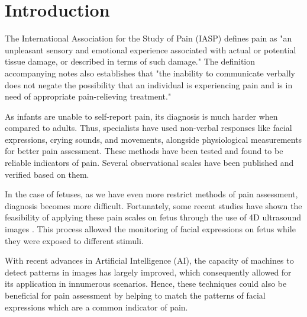 \documentclass[msc]{ppgccufmg}
\begin{document}

\chapter{Introduction}

The International Association for the Study of Pain (IASP) defines pain as "an unpleasant sensory and emotional experience associated with actual or potential tissue damage, or described in terms of such damage." \citep{merskey1994classification} The definition accompanying notes also establishes that "the inability to communicate verbally does not negate the possibility that an individual is experiencing pain and is in need of appropriate pain-relieving treatment."

As infants are unable to self-report pain, its diagnosis is much harder when compared to adults. Thus, specialists have used non-verbal responses like facial expressions, crying sounds, and movements, alongside physiological measurements for better pain assessment. These methods have been tested and found to be reliable indicators of pain. Several observational scales have been published and verified based on them.

In the case of fetuses, as we have even more restrict methods of pain assessment, diagnosis becomes more difficult. Fortunately, some recent studies have shown the feasibility of applying these pain scales on fetus through the use of 4D ultrasound images \citep{bernardes2018feasibility}. This process allowed the monitoring of facial expressions on fetus while they were exposed to different stimuli.

With recent advances in Artificial Intelligence (AI), the capacity of machines to detect patterns in images has largely improved, which consequently allowed for its application in innumerous scenarios. Hence, these techniques could also be beneficial for pain assessment by helping to match the patterns of facial expressions which are a common indicator of pain.
\end{document}
